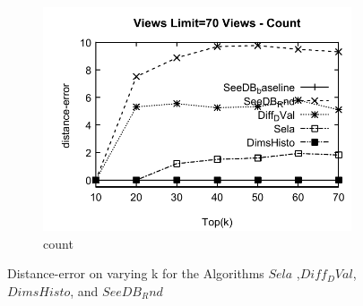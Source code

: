 \begin{figure}[h]
\begin{subfigure}[b]{0.32\textwidth}
    \includegraphics[width=\textwidth]{CountD1.pdf}
     \caption{count  }
        \label{fig:CountD1}
  \end{subfigure}
  \caption{Distance-error on varying k for the Algorithms $Sela$ ,$Diff_DVal$, $DimsHisto$, and $SeeDB_Rnd$}
\end{figure}


    
